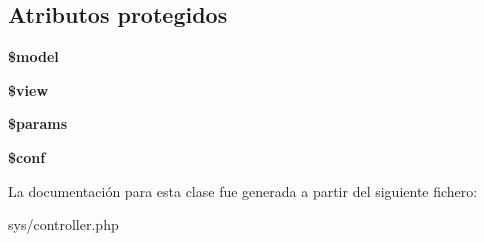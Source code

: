 \subsection*{Atributos protegidos}
\begin{DoxyCompactItemize}
\item 
\hypertarget{class_controller_a08fdd91bde255dbe3e2d15a22d9663e8}{}{\bfseries \$model}\label{class_controller_a08fdd91bde255dbe3e2d15a22d9663e8}

\item 
\hypertarget{class_controller_acccf2eac8663e0cebe8101e90fbab089}{}{\bfseries \$view}\label{class_controller_acccf2eac8663e0cebe8101e90fbab089}

\item 
\hypertarget{class_controller_afe68e6fbe7acfbffc0af0c84a1996466}{}{\bfseries \$params}\label{class_controller_afe68e6fbe7acfbffc0af0c84a1996466}

\item 
\hypertarget{class_controller_ae4901046cc3e1deebf77ccc785384a78}{}{\bfseries \$conf}\label{class_controller_ae4901046cc3e1deebf77ccc785384a78}

\end{DoxyCompactItemize}


La documentación para esta clase fue generada a partir del siguiente fichero\+:\begin{DoxyCompactItemize}
\item 
sys/controller.\+php\end{DoxyCompactItemize}
